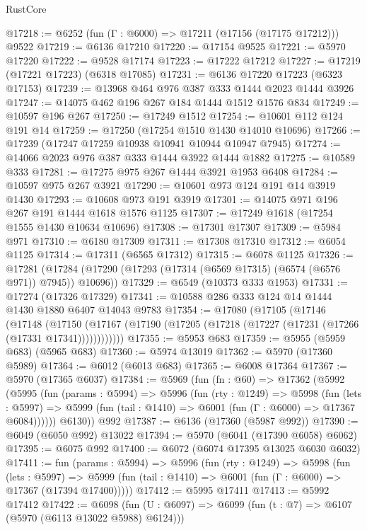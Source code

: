 \begin{lexlean}{RustCore}
\begin{coremodule}
@17218 := @6252 (fun (Γ : @6000) => @17211 (@17156 (@17175 @17212))) @9522
@17219 := @6136 @17210
@17220 := @17154 @9525
@17221 := @5970 @17220
@17222 := @9528 @17174
@17223 := @17222 @17212
@17227 := @17219 (@17221 @17223) (@6318 @17085)
@17231 := @6136 @17220 @17223 (@6323 @17153)
@17239 := @13968 @464 @976 @387 @333 @1444 @2023 @1444 @3926
@17247 := @14075 @462 @196 @267 @184 @1444 @1512 @1576 @834
@17249 := @10597 @196 @267
@17250 := @17249 @1512
@17254 := @10601 @112 @124 @191 @14
@17259 := @17250 (@17254 @1510 @1430 @14010 @10696)
@17266 := @17239 (@17247 @17259 @10938 @10941 @10944 @10947 @7945)
@17274 := @14066 @2023 @976 @387 @333 @1444 @3922 @1444 @1882
@17275 := @10589 @333
@17281 := @17275 @975 @267 @1444 @3921 @1953 @6408
@17284 := @10597 @975 @267 @3921
@17290 := @10601 @973 @124 @191 @14 @3919 @1430
@17293 := @10608 @973 @191 @3919
@17301 := @14075 @971 @196 @267 @191 @1444 @1618 @1576 @1125
@17307 := @17249 @1618 (@17254 @1555 @1430 @10634 @10696)
@17308 := @17301 @17307
@17309 := @5984 @971
@17310 := @6180 @17309
@17311 := @17308 @17310
@17312 := @6054 @1125
@17314 := @17311 (@6565 @17312)
@17315 := @6078 @1125
@17326 := @17281
    (@17284 (@17290 (@17293 (@17314 (@6569 @17315) (@6574 (@6576 @971)) @7945)) @10696))
@17329 := @6549 (@10373 @333 @1953)
@17331 := @17274 (@17326 @17329)
@17341 := @10588 @286 @333 @124 @14 @1444 @1430 @1880 @6407 @14043 @9783
@17354 := @17080
    (@17105
      (@17146
        (@17148
          (@17150 (@17167 (@17190 (@17205 (@17218 (@17227 (@17231 (@17266 (@17331 @17341))))))))))))
@17355 := @5953 @683
@17359 := @5955 (@5959 @683) (@5965 @683)
@17360 := @5974 @13019
@17362 := @5970 (@17360 @5989)
@17364 := @6012 (@6013 @683)
@17365 := @6008 @17364
@17367 := @5970 (@17365 @6037)
@17384 := @5969
    (fun (fn : @60) =>
    @17362
      (@5992
        (@5995
          (fun (params : @5994) =>
          @5996
            (fun (rty : @1249) =>
            @5998
              (fun (lets : @5997) =>
              @5999 (fun (tail : @1410) => @6001 (fun (Γ : @6000) => @17367 @6084))))))
        @6130))
    @992
@17387 := @6136 (@17360 (@5987 @992))
@17390 := @6049 (@6050 @992) @13022
@17394 := @5970 (@6041 (@17390 @6058) @6062)
@17395 := @6075 @992
@17400 := @6072 (@6074 @17395 @13025 @6030 @6032)
@17411 := fun (params : @5994) =>
  @5996
    (fun (rty : @1249) =>
    @5998
      (fun (lets : @5997) =>
      @5999 (fun (tail : @1410) => @6001 (fun (Γ : @6000) => @17367 (@17394 @17400)))))
@17412 := @5995 @17411
@17413 := @5992 @17412
@17422 := @6098
    (fun (U : @6097) => @6099 (fun (t : @7) => @6107 (@5970 (@6113 @13022 @5988) @6124)))

\end{coremodule}
\end{lexlean}
